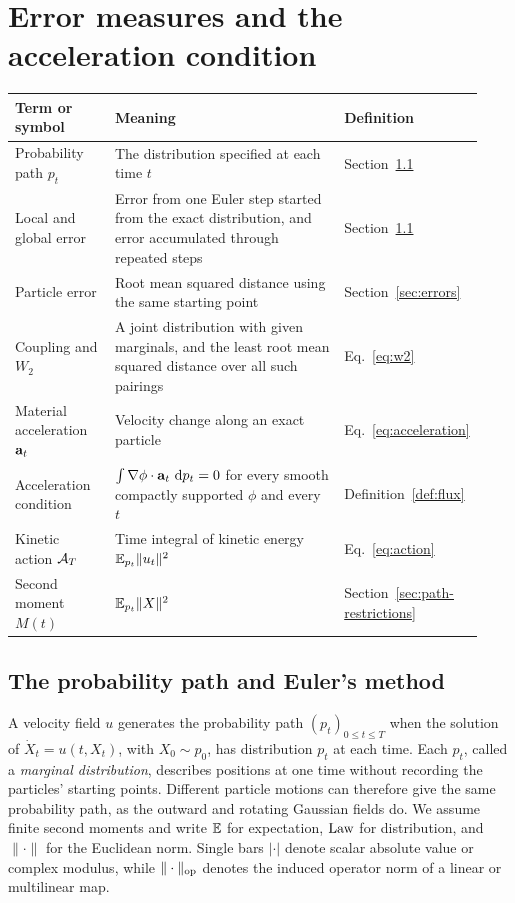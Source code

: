 \section{Error measures and the acceleration condition}
\label{sec:setup}

\begin{center}
\small
\begin{tabular}{@{}p{0.22\linewidth}p{0.57\linewidth}p{0.14\linewidth}@{}}
\toprule
Term or symbol & Meaning & Definition\\
\midrule
Probability path $p_t$ & The distribution specified at each time $t$ & Section~\ref{sec:path}\\
Local and global error & Error from one Euler step started from the exact distribution, and error accumulated through repeated steps & Section~\ref{sec:path}\\
Particle error & Root mean squared distance using the same starting point & Section~\ref{sec:errors}\\
Coupling and $W_2$ & A joint distribution with given marginals, and the least root mean squared distance over all such pairings & Eq.~\eqref{eq:w2}\\
Material acceleration $\mathbf a_t$ & Velocity change along an exact particle & Eq.~\eqref{eq:acceleration}\\
Acceleration condition & $\int\nabla\phi\cdot\mathbf a_t\,\,\mathrm d p_t=0$ for every smooth compactly supported $\phi$ and every $t$ & Definition~\ref{def:flux}\\
Kinetic action $\mathcal A_T$ & Time integral of kinetic energy $\mathbb E_{p_t}\|u_t\|^2$ & Eq.~\eqref{eq:action}\\
Second moment $M(t)$ & $\mathbb E_{p_t}\|X\|^2$ & Section~\ref{sec:path-restrictions}\\
\bottomrule
\end{tabular}
\end{center}

\subsection{The probability path and Euler's method}
\label{sec:path}

A velocity field $u$ generates the probability path $(p_t)_{0\le t\le T}$ when the solution of $\dot X_t=u(t,X_t)$, with $X_0\sim p_0$, has distribution $p_t$ at each time. Each $p_t$, called a \emph{marginal distribution}, describes positions at one time without recording the particles' starting points. Different particle motions can therefore give the same probability path, as the outward and rotating Gaussian fields do. We assume finite second moments and write $\mathbb E$ for expectation, $\operatorname{Law}$ for distribution, and $\|\cdot\|$ for the Euclidean norm. Single bars $|\cdot|$ denote scalar absolute value or complex modulus, while $\|\cdot\|_{\rm op}$ denotes the induced operator norm of a linear or multilinear map.

